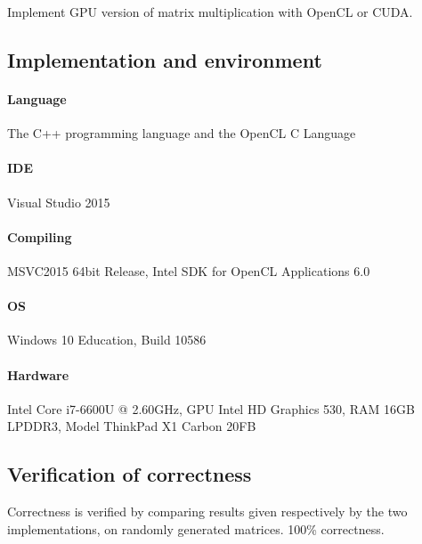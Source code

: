\begin{homeworkProblem}

Implement GPU version of matrix multiplication with OpenCL or CUDA.

\subsection{Implementation and environment}
\paragraph{Language} The C++ programming language and the OpenCL C Language
\paragraph{IDE} Visual Studio 2015
\paragraph{Compiling} MSVC2015 64bit Release, Intel SDK for OpenCL Applications 6.0
\paragraph{OS} Windows 10 Education, Build 10586
\paragraph{Hardware} Intel Core i7-6600U @ 2.60GHz, GPU Intel HD Graphics 530, RAM 16GB LPDDR3, Model ThinkPad X1 Carbon 20FB

\subsection{Verification of correctness}

Correctness is verified by comparing results given respectively by the two implementations, on randomly generated matrices. 100\% correctness.


\end{homeworkProblem}
